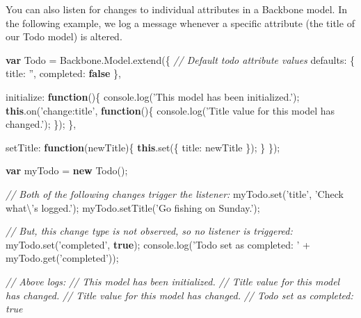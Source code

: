 \documentclass[9pt]{book}
\newenvironment{Shaded}{}{}
\newcommand{\KeywordTok}[1]{\textcolor[rgb]{0.00,0.44,0.13}{\textbf{{#1}}}}
\newcommand{\DataTypeTok}[1]{\textcolor[rgb]{0.56,0.13,0.00}{{#1}}}
\newcommand{\CharTok}[1]{\textcolor[rgb]{0.25,0.44,0.63}{{#1}}}
\newcommand{\StringTok}[1]{\textcolor[rgb]{0.25,0.44,0.63}{{#1}}}
\newcommand{\CommentTok}[1]{\textcolor[rgb]{0.38,0.63,0.69}{\textit{{#1}}}}
\newcommand{\OtherTok}[1]{\textcolor[rgb]{0.00,0.44,0.13}{{#1}}}
\newcommand{\FunctionTok}[1]{\textcolor[rgb]{0.02,0.16,0.49}{{#1}}}
\newcommand{\NormalTok}[1]{{#1}}
\begin{document}
You can also listen for changes to individual attributes in a Backbone
model. In the following example, we log a message whenever a specific
attribute (the title of our Todo model) is altered.

\begin{Shaded}
\begin{Highlighting}[]
\KeywordTok{var} \NormalTok{Todo = }\OtherTok{Backbone}\NormalTok{.}\OtherTok{Model}\NormalTok{.}\FunctionTok{extend}\NormalTok{(\{}
  \CommentTok{// Default todo attribute values}
  \DataTypeTok{defaults}\NormalTok{: \{}
    \DataTypeTok{title}\NormalTok{: }\StringTok{''}\NormalTok{,}
    \DataTypeTok{completed}\NormalTok{: }\KeywordTok{false}
  \NormalTok{\},}

  \DataTypeTok{initialize}\NormalTok{: }\KeywordTok{function}\NormalTok{()\{}
    \OtherTok{console}\NormalTok{.}\FunctionTok{log}\NormalTok{(}\StringTok{'This model has been initialized.'}\NormalTok{);}
    \KeywordTok{this}\NormalTok{.}\FunctionTok{on}\NormalTok{(}\StringTok{'change:title'}\NormalTok{, }\KeywordTok{function}\NormalTok{()\{}
        \OtherTok{console}\NormalTok{.}\FunctionTok{log}\NormalTok{(}\StringTok{'Title value for this model has changed.'}\NormalTok{);}
    \NormalTok{\});}
  \NormalTok{\},}

  \DataTypeTok{setTitle}\NormalTok{: }\KeywordTok{function}\NormalTok{(newTitle)\{}
    \KeywordTok{this}\NormalTok{.}\FunctionTok{set}\NormalTok{(\{ }\DataTypeTok{title}\NormalTok{: newTitle \});}
  \NormalTok{\}}
\NormalTok{\});}

\KeywordTok{var} \NormalTok{myTodo = }\KeywordTok{new} \FunctionTok{Todo}\NormalTok{();}

\CommentTok{// Both of the following changes trigger the listener:}
\OtherTok{myTodo}\NormalTok{.}\FunctionTok{set}\NormalTok{(}\StringTok{'title'}\NormalTok{, }\StringTok{'Check what}\CharTok{\textbackslash{}'}\StringTok{s logged.'}\NormalTok{);}
\OtherTok{myTodo}\NormalTok{.}\FunctionTok{setTitle}\NormalTok{(}\StringTok{'Go fishing on Sunday.'}\NormalTok{);}

\CommentTok{// But, this change type is not observed, so no listener is triggered:}
\OtherTok{myTodo}\NormalTok{.}\FunctionTok{set}\NormalTok{(}\StringTok{'completed'}\NormalTok{, }\KeywordTok{true}\NormalTok{);}
\OtherTok{console}\NormalTok{.}\FunctionTok{log}\NormalTok{(}\StringTok{'Todo set as completed: '} \NormalTok{+ }\OtherTok{myTodo}\NormalTok{.}\FunctionTok{get}\NormalTok{(}\StringTok{'completed'}\NormalTok{));}

\CommentTok{// Above logs:}
\CommentTok{// This model has been initialized.}
\CommentTok{// Title value for this model has changed.}
\CommentTok{// Title value for this model has changed.}
\CommentTok{// Todo set as completed: true}
\end{Highlighting}
\end{Shaded}
\end{document}
